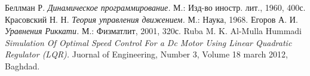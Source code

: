  Беллман Р. \textit{Динамическое программирование.} М.: Изд-во иностр. лит., 1960, 400с.
 Красовский Н. Н. \textit{Теория управления движением.} М.: Наука, 1968.
 Егоров А. И. \textit{Уравнения Риккати.} М.: Физматлит, 2001, 320с.
 Ruba M. K. Al-Mulla Hummadi \textit{Simulation Of Optimal Speed Control For a Dc Motor Using Linear Quadratic Regulator (LQR).} Juornal of Engineering, Number 3, Volume 18 march 2012, Baghdad.